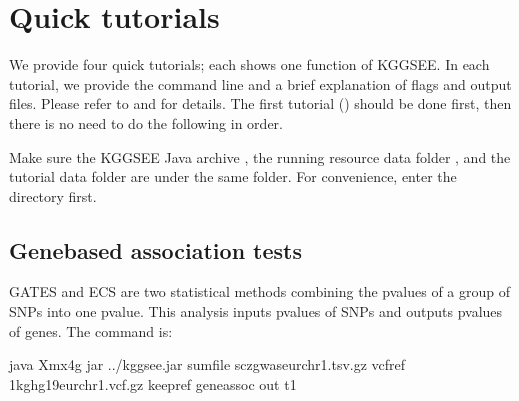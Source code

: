 \documentclass[letterpaper,10pt,english,openany,oneside]{sphinxmanual}
\begin{document}
\sphinxstepscope


\chapter{Quick tutorials}
\label{\detokenize{quick_tutorials:quick-tutorials}}\label{\detokenize{quick_tutorials:id1}}\label{\detokenize{quick_tutorials::doc}}
\sphinxAtStartPar
We provide four quick tutorials; each shows one function of KGGSEE. In each tutorial, we provide the command line and a brief explanation of flags and output files. Please refer to {\hyperref[\detokenize{detailed_document:detailed-document}]{}} and {\hyperref[\detokenize{options:options}]{}} for details. The first tutorial ({\hyperref[\detokenize{quick_tutorials:t1}]{}}) should be done first, then there is no need to do the following in order.

\sphinxAtStartPar
Make sure the KGGSEE Java archive , the running resource data folder , and the tutorial data folder  are under the same folder. For convenience, enter the  directory first.


\section{Gene\sphinxhyphen{}based association tests}
\label{\detokenize{quick_tutorials:gene-based-association-tests}}\label{\detokenize{quick_tutorials:t1}}
\sphinxAtStartPar
GATES and ECS are two statistical methods combining the p\sphinxhyphen{}values of a group of SNPs into one p\sphinxhyphen{}value. This analysis inputs p\sphinxhyphen{}values of SNPs and outputs p\sphinxhyphen{}values of genes. The command is:

\begin{sphinxVerbatim}[commandchars=\\\{\}]
java \PYGZhy{}Xmx4g \PYGZhy{}jar ../kggsee.jar 
  \PYGZhy{}\PYGZhy{}sum\PYGZhy{}file scz\PYGZus{}gwas\PYGZus{}eur\PYGZus{}chr1.tsv.gz 
  \PYGZhy{}\PYGZhy{}vcf\PYGZhy{}ref 1kg\PYGZus{}hg19\PYGZus{}eur\PYGZus{}chr1.vcf.gz 
  \PYGZhy{}\PYGZhy{}keep\PYGZhy{}ref 
  \PYGZhy{}\PYGZhy{}gene\PYGZhy{}assoc 
  \PYGZhy{}\PYGZhy{}out t1
\end{sphinxVerbatim}
\end{document}
